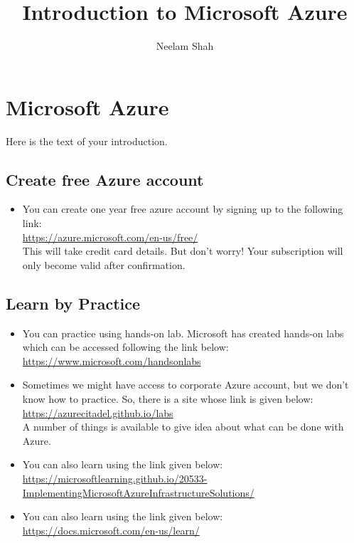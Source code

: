 \documentclass{article}
\begin{document}
\title{Introduction to Microsoft Azure{}}
\author{Neelam Shah}

\maketitle



\section{Microsoft Azure}
Here is the text of your introduction.



\subsection{Create free Azure account}
\begin{itemize}
	\item You can create one year free azure account by signing up to the following link: \\
	\url{https://azure.microsoft.com/en-us/free/}\\
	This will take credit card details. But don't worry! Your subscription will only become valid after confirmation.
\end{itemize}

\subsection{Learn by Practice}
\begin{itemize}
	\item You can practice using hands-on lab. Microsoft has created hands-on labs which can be accessed following the link below: \\
	\url{https://www.microsoft.com/handsonlabs}\\
	
	\item Sometimes we might have access to corporate Azure account, but we don't know how to practice. So, there is a site whose link is given below:\\
	\url{https://azurecitadel.github.io/labs}\\
	A number of things is available to give idea about what can be done with Azure.
	
	\item You can also learn using the link given below:\\
	\url{https://microsoftlearning.github.io/20533-ImplementingMicrosoftAzureInfrastructureSolutions/}\\
	
	\item You can also learn using the link given below:\\
	\url{https://docs.microsoft.com/en-us/learn/}
\end{itemize}
\end{document}
